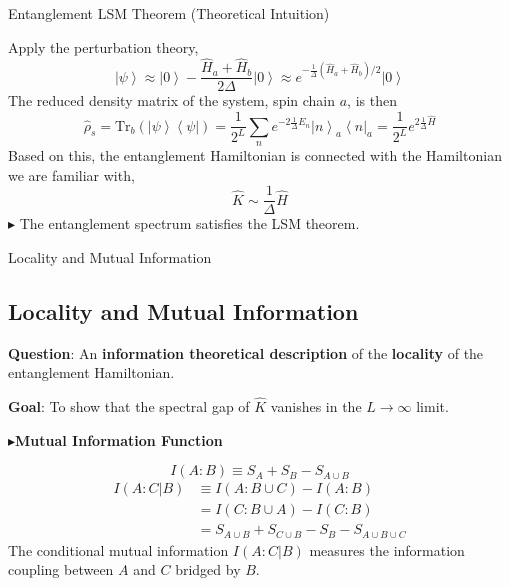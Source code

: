 \documentclass[professionalfont]{beamer}
\theoremstyle{definition}
\newcommand{\lr}[1]{\left(#1\right)}
\newcommand{\ket}[1]{\left| #1 \right\rangle}
\newcommand{\bra}[1]{\left\langle #1 \right|}
\newcommand{\mrm}[1]{\mathrm{#1}}
\newcommand{\here}{$\blacktriangleright$}
\begin{document}
\begin{frame}{Entanglement LSM Theorem (Theoretical Intuition)}

{\footnotesize
Apply the perturbation theory,
\[\ket{\psi} \approx \ket{0} - \frac{\hat{H}_a + \hat{H}_b}{2\Delta}\ket{0} \approx e^{-\frac{1}{\Delta}(\hat{H}_a + \hat{H}_b)/2}\ket{0}\]
The reduced density matrix of the system, spin chain $a$, is then
\[\hat{\rho}_s = \mrm{Tr}_b\lr{\ket{\psi}\bra{\psi}} = \frac{1}{2^L}\sum_{n}e^{-2\frac{1}{\Delta}E_n}\ket{n}_a\bra{n}_a = \frac{1}{2^L}e^{2\frac{1}{\Delta}\hat{H}}\]
Based on this, the entanglement Hamiltonian is connected with the Hamiltonian we are familiar with,
\[\hat{K}\sim \frac{1}{\Delta}\hat{H}\]
}
$\blacktriangleright$ The entanglement spectrum satisfies the LSM theorem.


\end{frame}
\begin{frame}{Locality and Mutual Information}
\subsection{Locality and Mutual Information}

{\Large\textbf{Question}}: An \textbf{information theoretical description }of the \textbf{locality} of the entanglement Hamiltonian.

\vspace{0.3cm}

{\Large\textbf{Goal}}: To show that the spectral gap of $\hat{K}$ vanishes in the $L\to\infty$ limit.

\vspace{0.3cm}

\here \textbf{Mutual Information Function}

\[I(A:B) \equiv S_A + S_B - S_{A\cup B}\]
\begin{align*}
    I(A:C|B) &\equiv  I(A:B\cup C) - I(A:B) \\
    &= I(C:B\cup A) - I(C:B) \\
    &= S_{A\cup B} + S_{C\cup B} - S_B - S_{A\cup B\cup C}
\end{align*}
The conditional mutual information $I(A:C|B)$ measures the information coupling between $A$ and $C$ bridged by $B$.


\end{frame}
\end{document}
